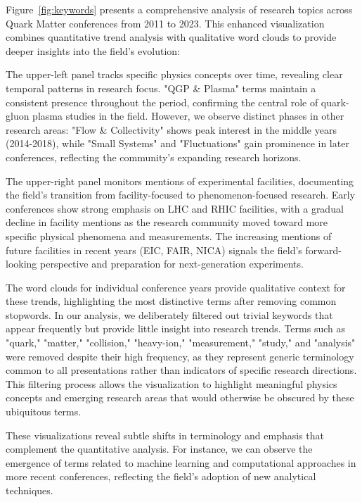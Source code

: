 \documentclass[a4paper,11pt]{article}
\begin{document}
Figure~\ref{fig:keywords} presents a comprehensive analysis of research topics across Quark Matter conferences from 2011 to 2023. This enhanced visualization combines quantitative trend analysis with qualitative word clouds to provide deeper insights into the field's evolution:

The upper-left panel tracks specific physics concepts over time, revealing clear temporal patterns in research focus. "QGP \& Plasma" terms maintain a consistent presence throughout the period, confirming the central role of quark-gluon plasma studies in the field. However, we observe distinct phases in other research areas: "Flow \& Collectivity" shows peak interest in the middle years (2014-2018), while "Small Systems" and "Fluctuations" gain prominence in later conferences, reflecting the community's expanding research horizons.

The upper-right panel monitors mentions of experimental facilities, documenting the field's transition from facility-focused to phenomenon-focused research. Early conferences show strong emphasis on LHC and RHIC facilities, with a gradual decline in facility mentions as the research community moved toward more specific physical phenomena and measurements. The increasing mentions of future facilities in recent years (EIC, FAIR, NICA) signals the field's forward-looking perspective and preparation for next-generation experiments.

The word clouds for individual conference years provide qualitative context for these trends, highlighting the most distinctive terms after removing common stopwords. In our analysis, we deliberately filtered out trivial keywords that appear frequently but provide little insight into research trends. Terms such as "quark," "matter," "collision," "heavy-ion," "measurement," "study," and "analysis" were removed despite their high frequency, as they represent generic terminology common to all presentations rather than indicators of specific research directions. This filtering process allows the visualization to highlight meaningful physics concepts and emerging research areas that would otherwise be obscured by these ubiquitous terms.

These visualizations reveal subtle shifts in terminology and emphasis that complement the quantitative analysis. For instance, we can observe the emergence of terms related to machine learning and computational approaches in more recent conferences, reflecting the field's adoption of new analytical techniques.
\end{document}
